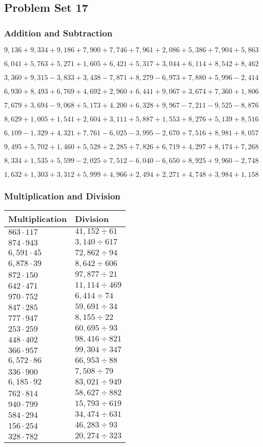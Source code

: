 \hypertarget{problem-set-17-3}{%
\subsection{Problem Set 17}\label{problem-set-17-3}}

\hypertarget{addition-and-subtraction-179}{%
\subsubsection{Addition and
Subtraction}\label{addition-and-subtraction-179}}

\(9,136+9,334+9,186+7,900+7,746+7,961+2,086+5,386+7,904+ 5,863\)

\(6,041+5,763+5,271+1,605+6,421+5,317+3,044+6,114+8,542+8,462\)

\(3,360+9,315-3,833+3,438-7,871+8,279-6,973+7,880+5,996-2,414\)

\(6,930+8,493+6,769+4,692+2,960+6,441+9,067+3,674+7,360+1,806\)

\(7,679+3,694-9,068+5,173+4,200+6,328+9,967-7,211-9,525-8,876\)

\(8,629+1,005+1,541+2,604+3,111+5,887+1,553+8,276+5,139+8,516\)

\(6,109-1,329+4,321+7,761-6,025-3,995-2,670+7,516+8,981+8,057\)

\(9,495+5,702+1,460+5,528+2,285+7,826+6,719+4,297+8,174+7,268\)

\(8,334+1,535+5,599-2,025+7,512-6,040-6,650+8,925+9,960-2,748\)

\(1,632+1,303+3,312+5,999+4,966+2,494+2,271+4,748+3,984+1,158\)

\hypertarget{multiplication-and-division-178}{%
\subsubsection{Multiplication and
Division}\label{multiplication-and-division-178}}

\begin{longtable}[]{@{}ll@{}}
\toprule
Multiplication & Division\tabularnewline
\midrule
\endhead
\(863\cdot117\) & \(41,152÷61\)\tabularnewline
\(874\cdot943\) & \(3,140÷617\)\tabularnewline
\(6,591\cdot45\) & \(72,862÷94\)\tabularnewline
\(6,878\cdot39\) & \(8,642÷606\)\tabularnewline
\(872\cdot150\) & \(97,877÷21\)\tabularnewline
\(642\cdot471\) & \(11,114÷469\)\tabularnewline
\(970\cdot752\) & \(6,414÷74\)\tabularnewline
\(847\cdot285\) & \(59,691÷34\)\tabularnewline
\(777\cdot947\) & \(8,155÷22\)\tabularnewline
\(253\cdot259\) & \(60,695÷93\)\tabularnewline
\(448\cdot402\) & \(98,416÷821\)\tabularnewline
\(366\cdot957\) & \(99,304÷347\)\tabularnewline
\(6,572\cdot86\) & \(66,953÷88\)\tabularnewline
\(336\cdot900\) & \(7,508÷79\)\tabularnewline
\(6,185\cdot92\) & \(83,021÷949\)\tabularnewline
\(762\cdot814\) & \(58,627÷882\)\tabularnewline
\(940\cdot799\) & \(15,793÷619\)\tabularnewline
\(584\cdot294\) & \(34,474÷631\)\tabularnewline
\(156\cdot254\) & \(46,283÷93\)\tabularnewline
\(328\cdot782\) & \(20,274÷323\)\tabularnewline
\bottomrule
\end{longtable}

